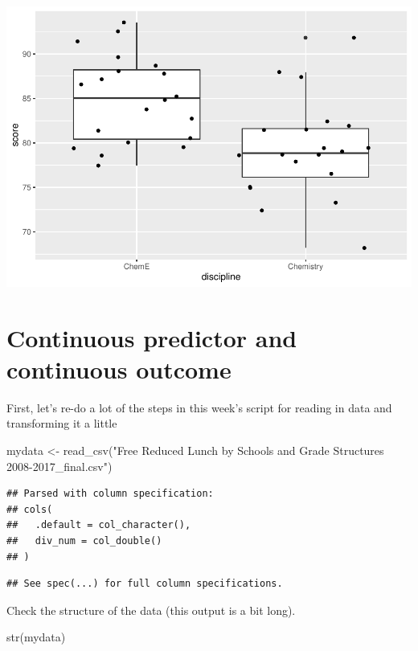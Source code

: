 \documentclass[
]{book}
\newenvironment{Shaded}{\begin{snugshade}}{\end{snugshade}}
\newcommand{\FunctionTok}[1]{\textcolor[rgb]{0.00,0.00,0.00}{#1}}
\newcommand{\NormalTok}[1]{#1}
\newcommand{\OtherTok}[1]{\textcolor[rgb]{0.56,0.35,0.01}{#1}}
\newcommand{\StringTok}[1]{\textcolor[rgb]{0.31,0.60,0.02}{#1}}
\begin{document}
\includegraphics{test_course_notes_files/figure-latex/box-and-dot-plot-1.pdf}

\hypertarget{continuous-predictor-and-continuous-outcome}{%
\section{Continuous predictor and continuous outcome}\label{continuous-predictor-and-continuous-outcome}}

First, let's re-do a lot of the steps in this week's script for reading in data and transforming it a little

\begin{Shaded}
\begin{Highlighting}[]
\NormalTok{mydata }\OtherTok{\textless{}{-}} \FunctionTok{read\_csv}\NormalTok{(}\StringTok{"Free Reduced Lunch by Schools and Grade Structures 2008{-}2017\_final.csv"}\NormalTok{)}
\end{Highlighting}
\end{Shaded}

\begin{verbatim}
## Parsed with column specification:
## cols(
##   .default = col_character(),
##   div_num = col_double()
## )
\end{verbatim}

\begin{verbatim}
## See spec(...) for full column specifications.
\end{verbatim}

Check the structure of the data (this output is a bit long).

\begin{Shaded}
\begin{Highlighting}[]
\FunctionTok{str}\NormalTok{(mydata)}
\end{Highlighting}
\end{Shaded}
\end{document}
